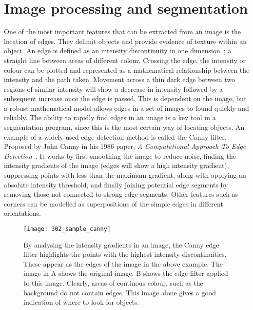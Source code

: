 \section{Image processing and segmentation}

One of the most important features that can be extracted from an image is the location of edges. They delimit objects and provide evidence of texture within an object. An edge is defined as an intensity discontinuity in one dimension~\cite{}; a straight line between areas of different colour. Crossing the edge, the intensity or colour can be plotted and represented as a mathematical relationship between the intensity and the path taken. Movement across a thin dark edge between two regions of similar intensity will show a decrease in intensity followed by a subsequent increase once the edge is passed. This is dependent on the image, but a robust mathematical model allows edges in a set of images to found quickly and reliably. The ability to rapidly find edges in an image is a key tool in a segmentation program, since this is the most certain way of locating objects. An example of a widely used edge detection method is called the Canny filter. Proposed by John Canny in his 1986 paper, \emph{A Computational Approach To Edge Detection}~\cite{}. It works by first smoothing the image to reduce noise, finding the intensity gradients of the image (edges will show a high intensity gradient), suppressing points with less than the maximum gradient, along with applying an absolute intensity threshold, and finally joining potential edge segments by removing those not connected to strong edge segments. Other features such as corners can be modelled as superpositions of the simple edges in different orientations.

\begin{figure}[h!]
 \centering
 \texttt{[image: 302\_sample\_canny]}
 \caption[Example of the Canny edge filter]{
 	By analysing the intensity gradients in an image, the Canny edge filter highlights the points with the highest intensity discontinuities. These appear as the edges of the image in the above example. The image in A shows the original image. B shows the edge filter applied to this image. Clearly, areas of continous colour, such as the background do not contain edges. This image alone gives a good indication of where to look for objects.
 }
 \label{fig:canny}
\end{figure}

